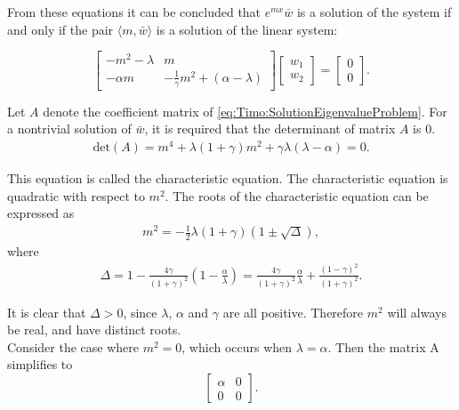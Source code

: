 \documentclass[../../main.tex]{subfiles}
\begin{document}
From these equations it can be concluded that $e^{mx}\bar{w}$ is a solution of the system if and only if the pair $\langle m,\bar{w} \rangle$ is a solution of the linear system:

\begin{equation}
\begin{bmatrix}
-m^{2}-\lambda & m\\
-\alpha m & -\frac{1}{\gamma}m^{2}+(\alpha- \lambda)
\end{bmatrix}
\begin{bmatrix}
w_{1}\\w_{2}
\end{bmatrix}
=
\begin{bmatrix}
0\\0
\end{bmatrix}. \label{eq:Timo:SolutionEigenvalueProblem}
\end{equation}

Let $A$ denote the coefficient matrix of \eqref{eq:Timo:SolutionEigenvalueProblem}. For a nontrivial solution of $\bar{w}$, it is required that the determinant of matrix $A$ is $0$.
\begin{align*}
\textrm{det}(A)=m^{4}+\lambda(1+\gamma)m^{2}+\gamma\lambda(\lambda-\alpha)=0. \label{TE7}
\end{align*}

This equation is called the characteristic equation. The characteristic equation is quadratic with respect to $m^2$. The roots of the characteristic equation can be expressed as
\begin{align}
m^{2}=-\frac{1}{2}\lambda(1+\gamma)(1\pm\sqrt{\Delta}),
\end{align}
where
\begin{align}
\Delta=1-\frac{4\gamma}{(1+\gamma)^{2}}\left(1-\frac{\alpha}{\lambda}\right)=\frac{4\gamma}{(1+\gamma)^{2}}\frac{\alpha}{\lambda}+\frac{(1-\gamma)^{2}}{(1+\gamma)^{2}}.
\end{align}

It is clear that $\Delta>0$, since $\lambda$, $\alpha$ and $\gamma$ are all positive. Therefore $m^{2}$ will always be real, and have distinct roots.\\

Consider the case where $m^{2} = 0$, which occurs when $\lambda = \alpha$. Then the matrix A simplifies to
\begin{equation*}
\begin{bmatrix}
	\alpha & 0\\
	0&0
	\end{bmatrix}.
\end{equation*}
\end{document}
